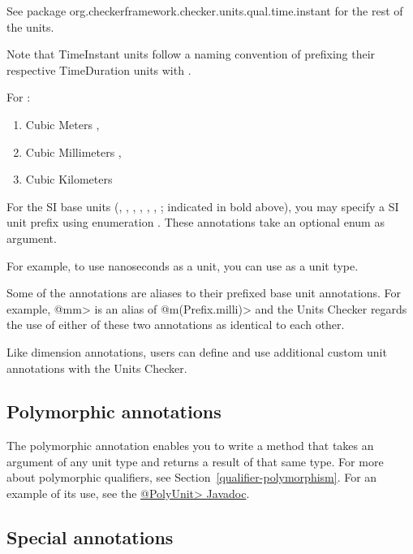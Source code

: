 See package 
{org.checkerframework.checker.units.qual.time.instant} for the rest of the
units.

Note that TimeInstant units follow a naming convention of prefixing their
respective TimeDuration units with .

For :
\begin{enumerate}
\item Cubic Meters ,
\item Cubic Millimeters ,
\item Cubic Kilometers 
\end{enumerate}

For the SI base units (, , , , ,
, ; indicated in bold above), you may specify a SI unit
prefix using enumeration . These
annotations take an optional  enum as argument.

For example, to use nanoseconds as a unit, you can use  as
a unit type.

Some of the annotations are aliases to their prefixed base unit annotations. For
example, \<@mm> is an alias of \<@m(Prefix.milli)> and the Units Checker regards
the use of either of these two annotations as identical to each other.

Like dimension annotations, users can define and use additional custom unit
annotations with the Units Checker.

\subsection{Polymorphic annotations\label{unit-poly-annotations}}

The polymorphic annotation  enables
you to write a method that takes an argument of any unit type and returns a
result of that same type. For more about polymorphic qualifiers, see
Section~\ref{qualifier-polymorphism}. For an example of its use, see the
\href{../api/org/checkerframework/checker/units/qual/PolyUnit.html}{\<@PolyUnit>
Javadoc}.

\subsection{Special annotations\label{unit-special-annotations}}

